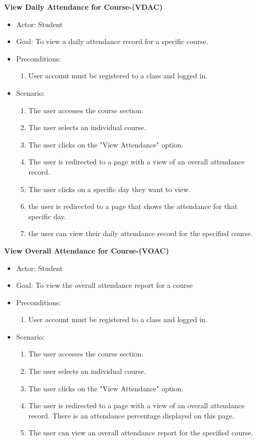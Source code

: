 \documentclass[letterpaper,12pt,oneside,listof=totoc]{scrreprt}
\begin{document}
\hfill \break
\textbf{View Daily Attendance for Course-(VDAC)}
\begin{itemize}
    \item Actor: Student
    \item Goal: To view a daily attendance record for a specific course.
    \item Preconditions:
    \begin{enumerate}
        \item User account must be registered to a class and logged in.
    \end{enumerate}
    \item Scenario:
    \begin{enumerate}
        \item The user accesses the course section.
        \item The user selects an individual course.
        \item The user clicks on the "View Attendance" option.
        \item The user is redirected to a page with a view of an overall attendance record.
        \item The user clicks on a specific day they want to view.
        \item the user is redirected to a page that shows the attendance for that specific day.
        \item the user can view their daily attendance record for the specified course.
    \end{enumerate}
\end{itemize}

\hfill \break
\textbf{View Overall Attendance for Course-(VOAC)}
\begin{itemize}
    \item Actor: Student
    \item Goal: To view the overall attendance report for a course
    \item Preconditions:
    \begin{enumerate}
        \item User account must be registered to a class and logged in.
    \end{enumerate}
    \item Scenario:
    \begin{enumerate}
        \item The user accesses the course section.
        \item The user selects an individual course.
        \item The user clicks on the "View Attendance" option.
        \item The user is redirected to a page with a view of an overall attendance record. There is an attendance percentage displayed on this page.
        \item The user can view an overall attendance report for the specified course.
    \end{enumerate}
\end{itemize}
\end{document}
